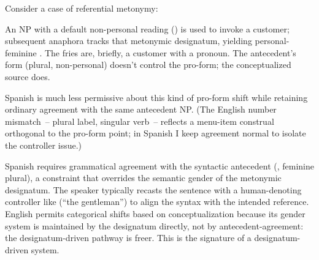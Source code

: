 Consider a case of referential metonymy:

\z
An NP with a default non-personal reading () is used to invoke a customer; subsequent anaphora tracks that metonymic designatum, yielding personal-feminine . The fries are, briefly, a customer with a pronoun. The antecedent's form (plural, non-personal) doesn't control the pro-form; the conceptualized source does.

Spanish is much less permissive about this kind of pro-form shift while retaining ordinary agreement with the same antecedent NP. (The English number mismatch~-- plural label, singular verb~-- reflects a menu-item construal orthogonal to the pro-form point; in Spanish I keep agreement normal to isolate the controller issue.)

\ea\label{ex:12:spanish}
    \z
\z
Spanish requires grammatical agreement with the syntactic antecedent (, feminine plural), a constraint that overrides the semantic gender of the metonymic designatum. The speaker typically recasts the sentence with a human-denoting controller like  (\enquote{the gentleman}) to align the syntax with the intended reference. English permits categorical shifts based on conceptualization because its gender system is maintained by the designatum directly, not by antecedent-agreement: the designatum-driven pathway is freer. This is the signature of a designatum-driven system.


